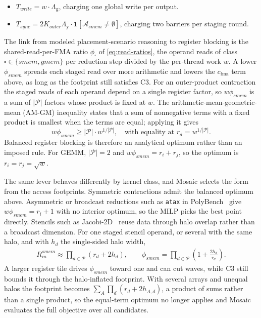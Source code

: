 \documentclass[acmsmall,review,anonymous,screen]{acmart}
\newcommand{\name}{{Mosaic}\xspace}
\newcommand{\rblk}{r}
\newcommand{\work}{w}
\newcommand{\Lg}{\Lambda_{\mathrm g}}
\newcommand{\Ly}{\Lambda_{\mathrm y}}
\newcommand{\cfma}{c_{\mathrm{fma}}}
\begin{document}
\begin{itemize}
  \item \(T_{\mathit{write}}=\work\cdot \Lg\), charging one global write per output.
  \item \(T_{\mathit{sync}}=2K_{\mathit{outer}}\Ly\cdot\mathbf{1}[\mathcal{A}_{\mathit{smem}}\ne\emptyset]\), charging two barriers per staging round.
\end{itemize}

The link from modeled placement-scenario reasoning to register blocking is the shared-read-per-FMA ratio \(\phi_{\square}\) of \autoref{eq:read-ratios}, the operand reads of class \(\square\in\{\mathit{smem},\mathit{gmem}\}\) per reduction step divided by the per-thread work \(\work\). A lower \(\phi_{\mathit{smem}}\) spreads each staged read over more arithmetic and lowers the \(\cfma\) term above, as long as the footprint still satisfies C3. For an outer-product contraction the staged reads of each operand depend on a single register factor, so \(\work\phi_{\mathit{smem}}\) is a sum of \(|\mathcal{P}|\) factors whose product is fixed at \(\work\). The arithmetic-mean-geometric-mean (AM-GM) inequality states that a sum of nonnegative terms with a fixed product is smallest when the terms are equal; applying it gives
\[
\work\phi_{\mathit{smem}} \ge |\mathcal{P}| \cdot \work^{1/|\mathcal{P}|},
\quad \text{with equality at } \rblk_d=\work^{1/|\mathcal{P}|}.
\]
Balanced register blocking is therefore an analytical optimum rather than an imposed rule. For GEMM, \(|\mathcal{P}|=2\) and \(\work\phi_{\mathit{smem}}=\rblk_i+\rblk_j\), so the optimum is \(\rblk_i=\rblk_j=\sqrt{\work}\).

The same lever behaves differently by kernel class, and \name selects the form from the access footprints. Symmetric contractions admit the balanced optimum above. Asymmetric or broadcast reductions such as \texttt{atax} in PolyBench~\cite{polybench} give \(\work\phi_{\mathit{smem}}=\rblk_i+1\) with no interior optimum, so the MILP picks the best point directly. Stencils such as Jacobi-2D~\cite{polybench} reuse data through halo overlap rather than a broadcast dimension. For one staged stencil operand, or several with the same halo, and with \(h_d\) the single-sided halo width,
\begin{equation}
\begin{aligned}
R^{\mathit{smem}}_{\mathit{in}}
\approx \prod_{d\in\mathcal{P}}(\rblk_d+2h_d),
\qquad
\phi_{\mathit{smem}}
= \prod_{d\in\mathcal{P}}\left(1+\frac{2h_d}{\rblk_d}\right).
\end{aligned}
\label{eq:stencil-halo}
\end{equation}
A larger register tile drives \(\phi_{\mathit{smem}}\) toward one and can cut waves, while C3 still bounds it through the halo-inflated footprint. With several arrays and unequal halos the footprint becomes \(\sum_A\prod_d(\rblk_d+2h_{A,d})\), a product of sums rather than a single product, so the equal-term optimum no longer applies and \name evaluates the full objective over all candidates.
\end{document}
